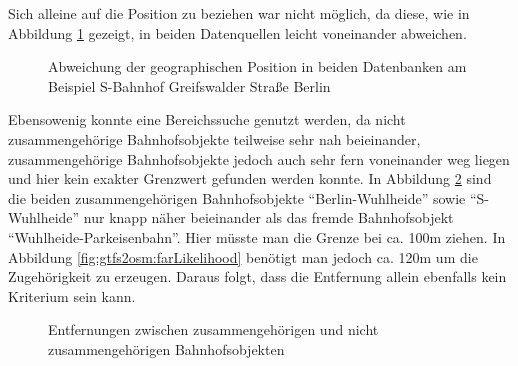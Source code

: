 Sich alleine auf die Position zu beziehen war nicht möglich, da diese, wie in Abbildung \ref{fig:gtfs2osm:geoDiff} gezeigt, in beiden Datenquellen leicht voneinander abweichen.
\begin{figure}[htb]
   \centering
   \caption{Abweichung der geographischen Position in beiden Datenbanken am Beispiel S-Bahnhof Greifswalder Straße Berlin}
   \label{fig:gtfs2osm:geoDiff}
 \end{figure}
Ebensowenig konnte eine Bereichssuche genutzt werden, da nicht zusammengehörige Bahnhofsobjekte teilweise sehr nah beieinander, zusammengehörige Bahnhofsobjekte jedoch auch sehr fern voneinander weg liegen und hier kein exakter Grenzwert gefunden werden konnte. In Abbildung \ref{fig:gtfs2osm:nearNameDiff} sind die beiden zusammengehörigen Bahnhofsobjekte ``Berlin-Wuhlheide'' sowie ``S-Wuhlheide'' nur knapp näher beieinander als das fremde Bahnhofsobjekt ``Wuhlheide-Parkeisenbahn''. Hier müsste man die Grenze bei ca. 100m ziehen. In Abbildung \ref{fig:gtfs2osm:farLikelihood} benötigt man jedoch ca. 120m um die Zugehörigkeit zu erzeugen. Daraus folgt, dass die Entfernung allein ebenfalls kein Kriterium sein kann.
\begin{figure}[htb]
   \centering
   \caption{Entfernungen zwischen zusammengehörigen und nicht zusammengehörigen Bahnhofsobjekten}
   \label{fig:gtfs2osm:nearNameDiff}
 \end{figure}
